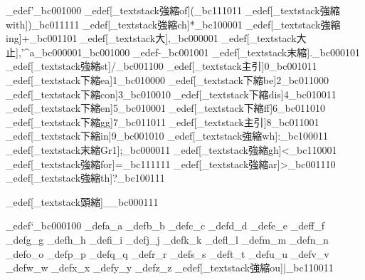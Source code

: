 \brl@char_edef{'}{\brl@char_bc001000}
\brl@char_edef[\brl@char_textstack{強縮}{of}]{(}{\brl@char_bc111011}
\brl@char_edef[\brl@char_textstack{強縮}{with}]{)}{\brl@char_bc011111}
\brl@char_edef[\brl@char_textstack{強縮}{ch}]{*}{\brl@char_bc100001}
\brl@char_edef[\brl@char_textstack{強縮}{ing}]{+}{\brl@char_bc001101}
\brl@char_edef[\brl@char_textstack{大}{}]{,}{\brl@char_bc000001}
\brl@char_edef[\brl@char_textstack{大止}{}]{,'^a}{\brl@char_bc000001\brl@char_bc001000}%
\brl@char_edef{-}{\brl@char_bc001001}
\brl@char_edef[\brl@char_textstack{末縮}{}]{.}{\brl@char_bc000101}
\brl@char_edef[\brl@char_textstack{強縮}{st}]{/}{\brl@char_bc001100}
\brl@char_edef[\brl@char_textstack{主引}{}]{0}{\brl@char_bc001011}
\brl@char_edef[\brl@char_textstack{下縮}{ea}]{1}{\brl@char_bc010000}
\brl@char_edef[\brl@char_textstack{下縮}{be}]{2}{\brl@char_bc011000}
\brl@char_edef[\brl@char_textstack{下縮}{con}]{3}{\brl@char_bc010010}
\brl@char_edef[\brl@char_textstack{下縮}{dis}]{4}{\brl@char_bc010011}
\brl@char_edef[\brl@char_textstack{下縮}{en}]{5}{\brl@char_bc010001}
\brl@char_edef[\brl@char_textstack{下縮}{ff}]{6}{\brl@char_bc011010}
\brl@char_edef[\brl@char_textstack{下縮}{gg}]{7}{\brl@char_bc011011}
\brl@char_edef[\brl@char_textstack{主引}{}]{8}{\brl@char_bc011001}%
\brl@char_edef[\brl@char_textstack{下縮}{in}]{9}{\brl@char_bc001010}
\brl@char_edef[\brl@char_textstack{強縮}{wh}]{:}{\brl@char_bc100011}
\brl@char_edef[\brl@char_textstack{末縮}{Gr1}]{;}{\brl@char_bc000011}
\brl@char_edef[\brl@char_textstack{強縮}{gh}]{<}{\brl@char_bc110001}
\brl@char_edef[\brl@char_textstack{強縮}{for}]{=}{\brl@char_bc111111}
\brl@char_edef[\brl@char_textstack{強縮}{ar}]{>}{\brl@char_bc001110}
\brl@char_edef[\brl@char_textstack{強縮}{th}]{?}{\brl@char_bc100111}


\brl@char_edef[\brl@char_textstack{頭縮}{}]{_}{\brl@char_bc000111}

\brl@char_edef{`}{\brl@char_bc000100}%
\brl@char_def{a}{\brl@char@alias_a}
\brl@char_def{b}{\brl@char@alias_b}
\brl@char_def{c}{\brl@char@alias_c}
\brl@char_def{d}{\brl@char@alias_d}
\brl@char_def{e}{\brl@char@alias_e}
\brl@char_def{f}{\brl@char@alias_f}
\brl@char_def{g}{\brl@char@alias_g}
\brl@char_def{h}{\brl@char@alias_h}
\brl@char_def{i}{\brl@char@alias_i}
\brl@char_def{j}{\brl@char@alias_j}
\brl@char_def{k}{\brl@char@alias_k}
\brl@char_def{l}{\brl@char@alias_l}
\brl@char_def{m}{\brl@char@alias_m}
\brl@char_def{n}{\brl@char@alias_n}
\brl@char_def{o}{\brl@char@alias_o}
\brl@char_def{p}{\brl@char@alias_p}
\brl@char_def{q}{\brl@char@alias_q}
\brl@char_def{r}{\brl@char@alias_r}
\brl@char_def{s}{\brl@char@alias_s}
\brl@char_def{t}{\brl@char@alias_t}
\brl@char_def{u}{\brl@char@alias_u}
\brl@char_def{v}{\brl@char@alias_v}
\brl@char_def{w}{\brl@char@alias_w}
\brl@char_def{x}{\brl@char@alias_x}
\brl@char_def{y}{\brl@char@alias_y}
\brl@char_def{z}{\brl@char@alias_z}
\brl@char_edef[\brl@char_textstack{強縮}{ou}]{|}{\brl@char_bc110011}%


